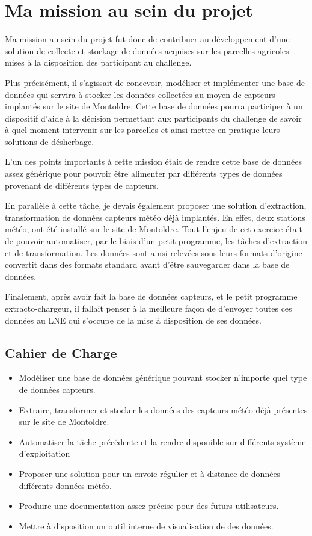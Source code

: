 \section{Ma mission au sein du projet}
Ma mission au sein du projet fut donc de contribuer au développement d’une solution de collecte et stockage de données acquises sur les parcelles agricoles mises à la disposition des participant au challenge. 

Plus précisément, il s’agissait de concevoir, modéliser et implémenter une base de données qui servira à stocker les données collectées au moyen de capteurs implantés sur le site de Montoldre. Cette base de données pourra participer à un dispositif d’aide à la décision permettant aux participants du challenge de savoir à quel moment intervenir sur les parcelles et ainsi mettre en pratique leurs solutions de désherbage.  

L’un des points importants à cette mission était de rendre cette base de données assez générique pour pouvoir être alimenter par différents types de données provenant de différents types de capteurs. 

En parallèle à cette tâche, je devais également proposer une solution d’extraction, transformation de données capteurs météo déjà implantés. En effet, deux stations météo, ont été installé sur le site de Montoldre. Tout l’enjeu de cet exercice était de pouvoir automatiser, par le biais d’un petit programme, les tâches d’extraction et de transformation. Les données sont ainsi relevées sous leurs formats d’origine convertit dans des formats standard avant d’être sauvegarder dans la base de données. 

Finalement, après avoir fait la base de données capteurs, et le petit programme extracto-chargeur, il fallait penser à la meilleure façon de d’envoyer toutes ces données au LNE qui s’occupe de la mise à disposition de ses données. 

 
\subsection{Cahier de Charge}
 \begin{itemize}
      \item Modéliser une base de données générique pouvant stocker n’importe quel type de données capteurs. 
     \item Extraire, transformer et stocker les données des capteurs météo déjà présentes sur le site de Montoldre.
     \item Automatiser la tâche précédente et la rendre disponible sur différents système d’exploitation 
     \item Proposer une solution pour un envoie régulier et à distance de données différents données météo. 
     \item Produire une documentation assez précise pour des futurs utilisateurs. 
     \item Mettre à disposition un outil interne de visualisation de des données. 
 \end{itemize}

